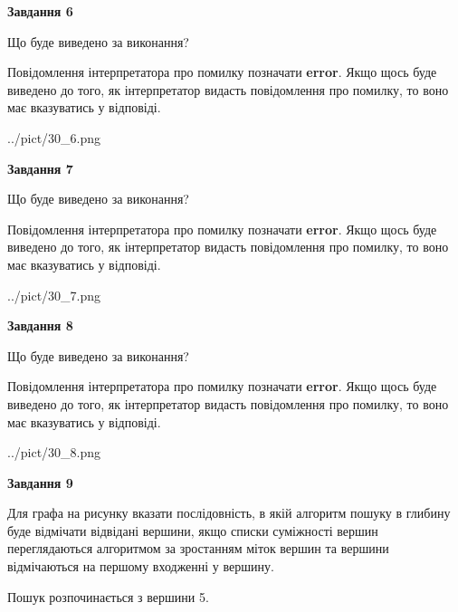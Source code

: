 \documentclass[12pt, ukrainian]{article}
\begin{document}
{\begin {large}
{\begin {center}\textbf{Завдання 6}\end {center}}\par
Що буде виведено за виконання?

Повідомлення інтерпретатора про помилку позначати \textbf{error}.
Якщо щось буде виведено до того, як інтерпретатор видасть повідомлення про помилку, 
то воно має вказуватись у відповіді. \par


\begin{center}
	{../pict/30_6.png}
\end{center}
\newpage

{\begin {center}\textbf{Завдання 7}\end {center}}\par
Що буде виведено за виконання?

Повідомлення інтерпретатора про помилку позначати \textbf{error}.
Якщо щось буде виведено до того, як інтерпретатор видасть повідомлення про помилку, 
то воно має вказуватись у відповіді. \par


\begin{center}
	{../pict/30_7.png}
\end{center}
\newpage

{\begin {center}\textbf{Завдання 8}\end {center}}\par
Що буде виведено за виконання?

Повідомлення інтерпретатора про помилку позначати \textbf{error}.
Якщо щось буде виведено до того, як інтерпретатор видасть повідомлення про помилку, 
то воно має вказуватись у відповіді. \par


\begin{center}
	{../pict/30_8.png}
\end{center}
\newpage

{\begin {center}\textbf{Завдання 9}\end {center}}\par
Для графа на рисунку вказати послідовність, в якій алгоритм пошуку в глибину буде відмічати відвідані вершини, якщо списки суміжності вершин переглядаються алгоритмом за зростанням міток вершин та вершини відмічаються на першому вход\-женні у вершину.\par
Пошук розпочинається з вершини 5.\par


\end{large}}
\end{document}
